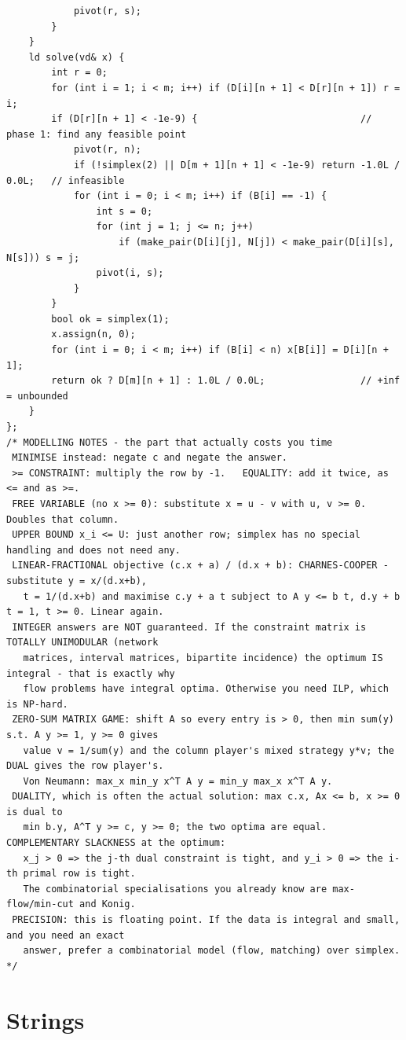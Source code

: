 \documentclass[9pt,a4paper,twocolumn]{extarticle}
\begin{document}
\begin{lstlisting}
            pivot(r, s);
        }
    }
    ld solve(vd& x) {
        int r = 0;
        for (int i = 1; i < m; i++) if (D[i][n + 1] < D[r][n + 1]) r = i;
        if (D[r][n + 1] < -1e-9) {                             // phase 1: find any feasible point
            pivot(r, n);
            if (!simplex(2) || D[m + 1][n + 1] < -1e-9) return -1.0L / 0.0L;   // infeasible
            for (int i = 0; i < m; i++) if (B[i] == -1) {
                int s = 0;
                for (int j = 1; j <= n; j++)
                    if (make_pair(D[i][j], N[j]) < make_pair(D[i][s], N[s])) s = j;
                pivot(i, s);
            }
        }
        bool ok = simplex(1);
        x.assign(n, 0);
        for (int i = 0; i < m; i++) if (B[i] < n) x[B[i]] = D[i][n + 1];
        return ok ? D[m][n + 1] : 1.0L / 0.0L;                 // +inf = unbounded
    }
};
/* MODELLING NOTES - the part that actually costs you time
 MINIMISE instead: negate c and negate the answer.
 >= CONSTRAINT: multiply the row by -1.   EQUALITY: add it twice, as <= and as >=.
 FREE VARIABLE (no x >= 0): substitute x = u - v with u, v >= 0. Doubles that column.
 UPPER BOUND x_i <= U: just another row; simplex has no special handling and does not need any.
 LINEAR-FRACTIONAL objective (c.x + a) / (d.x + b): CHARNES-COOPER - substitute y = x/(d.x+b),
   t = 1/(d.x+b) and maximise c.y + a t subject to A y <= b t, d.y + b t = 1, t >= 0. Linear again.
 INTEGER answers are NOT guaranteed. If the constraint matrix is TOTALLY UNIMODULAR (network
   matrices, interval matrices, bipartite incidence) the optimum IS integral - that is exactly why
   flow problems have integral optima. Otherwise you need ILP, which is NP-hard.
 ZERO-SUM MATRIX GAME: shift A so every entry is > 0, then min sum(y) s.t. A y >= 1, y >= 0 gives
   value v = 1/sum(y) and the column player's mixed strategy y*v; the DUAL gives the row player's.
   Von Neumann: max_x min_y x^T A y = min_y max_x x^T A y.
 DUALITY, which is often the actual solution: max c.x, Ax <= b, x >= 0  is dual to
   min b.y, A^T y >= c, y >= 0; the two optima are equal. COMPLEMENTARY SLACKNESS at the optimum:
   x_j > 0 => the j-th dual constraint is tight, and y_i > 0 => the i-th primal row is tight.
   The combinatorial specialisations you already know are max-flow/min-cut and Konig.
 PRECISION: this is floating point. If the data is integral and small, and you need an exact
   answer, prefer a combinatorial model (flow, matching) over simplex. */
\end{lstlisting}

\section{Strings}
\end{document}
